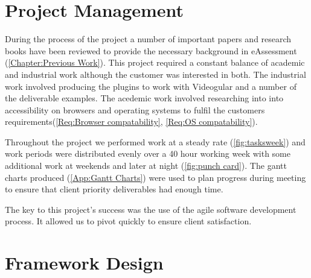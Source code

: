 \section{Project Management}

During the process of the project a number of important papers and research books have been reviewed to provide the necessary background in eAssessment (\autoref{Chapter:Previous Work}). This project required a constant balance of academic and industrial work although the customer was interested in both. The industrial work involved producing the plugins to work with Videogular and a number of the deliverable examples. The acedemic work involved researching into into accessibility on browsers and operating systems to fulfil the customers requirements(\cref{Req:Browser compatability}, \cref{Req:OS compatability}).

Throughout the project we performed work at a steady rate (\autoref{fig:tasksweek}) and work periods were distributed evenly over a 40 hour working week with some additional work at weekends and later at night (\autoref{fig:punch card}). The gantt charts produced (\autoref{App:Gantt Charts}) were used to plan progress during meeting to ensure that client priority deliverables had enough time.

The key to this project's success was the use of the agile software development process. It allowed us to pivot quickly to ensure client satisfaction.









\section{Framework Design}


